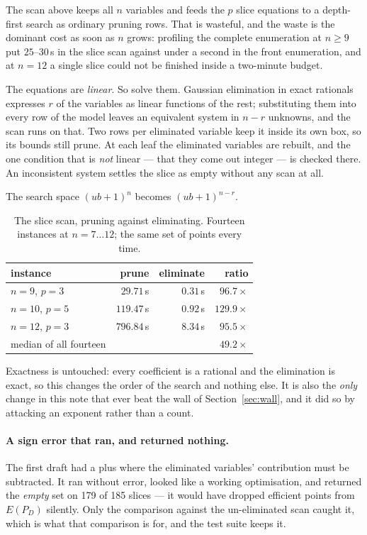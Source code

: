 \documentclass[11pt,a4paper]{article}
\newcommand{\Dset}{D}
\newcommand{\E}{E(P_{\Dset})}
\begin{document}
The scan above keeps all $n$ variables and feeds the $p$ slice equations to a
depth-first search as ordinary pruning rows.  That is wasteful, and the waste
is the dominant cost as soon as $n$ grows: profiling the complete enumeration
at $n \geqslant 9$ put $25$--$30$\,s in the slice scan against under a second
in the front enumeration, and at $n = 12$ a single slice could not be finished
inside a two-minute budget.

The equations are \emph{linear}.  So solve them.  Gaussian elimination in exact
rationals expresses $r$ of the variables as linear functions of the rest;
substituting them into every row of the model leaves an equivalent system in
$n - r$ unknowns, and the scan runs on that.  Two rows per eliminated variable
keep it inside its own box, so its bounds still prune.  At each leaf the
eliminated variables are rebuilt, and the one condition that is \emph{not}
linear --- that they come out integer --- is checked there.  An inconsistent
system settles the slice as empty without any scan at all.

The search space $(ub+1)^{n}$ becomes $(ub+1)^{n-r}$.

\begin{table}[h]
\centering
\caption{The slice scan, pruning against eliminating.  Fourteen instances at
$n = 7 \dots 12$; the same set of points every time.}
\begin{tabular}{lrrr}
\toprule
instance & prune & eliminate & ratio \\
\midrule
$n=9$, $p=3$  & $29.71$\,s  & $0.31$\,s & $96.7\times$ \\
$n=10$, $p=5$ & $119.47$\,s & $0.92$\,s & $129.9\times$ \\
$n=12$, $p=3$ & $796.84$\,s & $8.34$\,s & $95.5\times$ \\
\midrule
median of all fourteen & & & $\mathbf{49.2\times}$ \\
\bottomrule
\end{tabular}
\end{table}

\noindent
Exactness is untouched: every coefficient is a rational and the elimination is
exact, so this changes the order of the search and nothing else.  It is also
the \emph{only} change in this note that ever beat the wall of
Section~\ref{sec:wall}, and it did so by attacking an exponent rather than a
count.

\paragraph{A sign error that ran, and returned nothing.}  The first draft had a
plus where the eliminated variables' contribution must be subtracted.  It ran
without error, looked like a working optimisation, and returned the
\emph{empty} set on 179 of 185 slices --- it would have dropped efficient
points from $\E$ silently.  Only the comparison against the un-eliminated scan
caught it, which is what that comparison is for, and the test suite keeps it.
\end{document}
